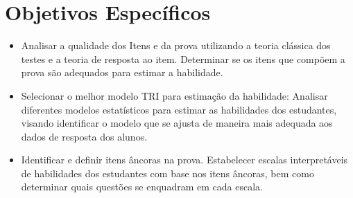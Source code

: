 \section{Objetivos Específicos}

\begin{itemize}
	
\item Analisar a qualidade dos Itens e da prova utilizando a teoria clássica dos testes e a teoria de resposta ao item. Determinar se os itens que compõem a prova são adequados para estimar a habilidade.	
	
\item Selecionar o melhor modelo TRI para estimação da habilidade: Analisar diferentes modelos estatísticos para estimar as habilidades dos estudantes, visando identificar o modelo que se ajusta de maneira mais adequada aos dados de resposta dos alunos. 

\begin{comment}
\item Estimar os Parâmetros TRI dos Itens: Investigar os parâmetros de dificuldade, discriminação e chute (acerto casual) das questões presentes na prova, visando compreender suas características de medida e avaliar sua qualidade na avaliação da habilidade dos estudantes. Essa análise permite determinar se algumas questões devem ser descartadas devido à sua baixa qualidade ou se podem compor um banco de itens para avaliações futuras. 


\item Avaliar : Verificar se a prova é unidimensional, ou seja, se está avaliando apenas uma variável latente, assegurando que os itens sejam coesos e estejam medindo a mesma habilidade subjacente. Caso não esteja avaliando a mesma dimensão, avaliar qual a dimensionalidade do teste.
\item Avaliar a Abrangência na faixa da habilidade: Verificar em qual faixa de habilidade o teste se encontra e identificar quais níveis de habilidade precisam de maior representação por meio da inclusão de mais questões.

\end{comment}

\item Identificar e definir itens âncoras na prova. Estabelecer escalas interpretáveis de habilidades dos estudantes com base nos itens âncoras, bem como determinar quais questões se enquadram em cada escala.




\end{itemize}



